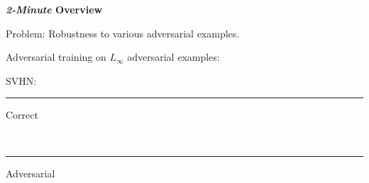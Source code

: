 \documentclass[64pt]{beamer}
\begin{document}
	\begin{frame}[t]{\bfseries \textit{2-Minute} Overview}
		\Large
		
		Problem: Robustness to various adversarial examples.
		\vskip 0.25cm
		
		Adversarial training on {\color{MPIIred}$L_\infty$} adversarial examples:
		
		\begin{minipage}[t]{0.7\textwidth}
			\vspace*{0px}
			\hfill
		\end{minipage}
		\hfill
		\begin{minipage}[t]{0.28\textwidth}
			\vspace*{4px}
			
			\begin{tcolorbox}[
				left=0pt,
				right=0pt,
				top=0pt,
				bottom=0pt,
				colback=gray!12!white,
				colframe=gray!12!white,
				width=1\textwidth, 
				enlarge left by=0mm,
				boxsep=5pt,
				arc=0pt,outer arc=0pt,
				boxrule=1pt,
				]
				\large\color{MPIIblack}
				SVHN:\\
				\textcolor{colorbrewer2}{{\rule[4pt]{10pt}{2pt} Correct}}\\ \textcolor{colorbrewer8}{{\rule[4pt]{10pt}{2pt} Adversarial}}
			\end{tcolorbox}
		\end{minipage}
	\end{frame}

%		
%		
\end{document}
